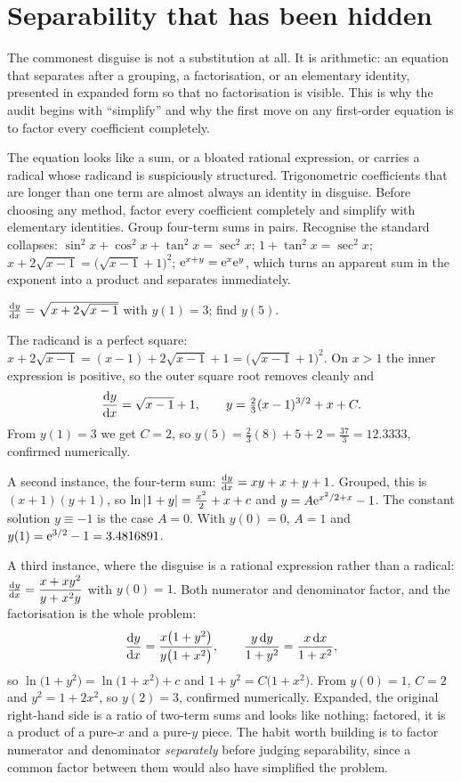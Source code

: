 \section{Separability that has been hidden}

The commonest disguise is not a substitution at all. It is arithmetic: an equation that separates after a grouping, a factorisation, or an elementary identity, presented in expanded form so that no factorisation is visible. This is why the audit begins with ``simplify'' and why the first move on any first-order equation is to factor every coefficient completely.

\cue The equation looks like a sum, or a bloated rational expression, or carries a radical whose radicand is suspiciously structured. Trigonometric coefficients that are longer than one term are almost always an identity in disguise.
\method Before choosing any method, factor every coefficient completely and simplify with elementary identities. Group four-term sums in pairs. Recognise the standard collapses: $\sin^{2}x+\cos^{2}x+\tan^{2}x=\sec^{2}x$; $1+\tan^{2}x=\sec^{2}x$; $x+2\sqrt{x-1}=\bigl(\sqrt{x-1}+1\bigr)^{2}$; $\mathrm{e}^{x+y}=\mathrm{e}^{x}\mathrm{e}^{y}$, which turns an apparent sum in the exponent into a product and separates immediately.

\begin{worked}
$\frac{\mathrm{d}y}{\mathrm{d}x}=\sqrt{x+2\sqrt{x-1}}$ with $y(1)=3$; find $y(5)$.

The radicand is a perfect square: $x+2\sqrt{x-1}=(x-1)+2\sqrt{x-1}+1=\bigl(\sqrt{x-1}+1\bigr)^{2}$. On $x>1$ the inner expression is positive, so the outer square root removes cleanly and
\[\frac{\mathrm{d}y}{\mathrm{d}x}=\sqrt{x-1}+1,\qquad y=\tfrac23(x-1)^{3/2}+x+C.\]
From $y(1)=3$ we get $C=2$, so $y(5)=\tfrac23(8)+5+2=\tfrac{37}{3}=12.3333$, confirmed numerically.

A second instance, the four-term sum: $\frac{\mathrm{d}y}{\mathrm{d}x}=xy+x+y+1$. Grouped, this is $(x+1)(y+1)$, so $\ln\left\lvert 1+y\right\rvert=\tfrac{x^{2}}{2}+x+c$ and $y=A\mathrm{e}^{x^{2}/2+x}-1$. The constant solution $y\equiv-1$ is the case $A=0$. With $y(0)=0$, $A=1$ and $y(1)=\mathrm{e}^{3/2}-1=3.4816891$.
\end{worked}

A third instance, where the disguise is a rational expression rather than a radical: $\frac{\mathrm{d}y}{\mathrm{d}x}=\dfrac{x+xy^{2}}{y+x^{2}y}$ with $y(0)=1$. Both numerator and denominator factor, and the factorisation is the whole problem:
\[\frac{\mathrm{d}y}{\mathrm{d}x}=\frac{x\bigl(1+y^{2}\bigr)}{y\bigl(1+x^{2}\bigr)},\qquad \frac{y\,\mathrm{d} y}{1+y^{2}}=\frac{x\,\mathrm{d} x}{1+x^{2}},\]
so $\ln\bigl(1+y^{2}\bigr)=\ln\bigl(1+x^{2}\bigr)+c$ and $1+y^{2}=C\bigl(1+x^{2}\bigr)$. From $y(0)=1$, $C=2$ and $y^{2}=1+2x^{2}$, so $y(2)=3$, confirmed numerically. Expanded, the original right-hand side is a ratio of two-term sums and looks like nothing; factored, it is a product of a pure-$x$ and a pure-$y$ piece. The habit worth building is to factor numerator and denominator \emph{separately} before judging separability, since a common factor between them would also have simplified the problem.

